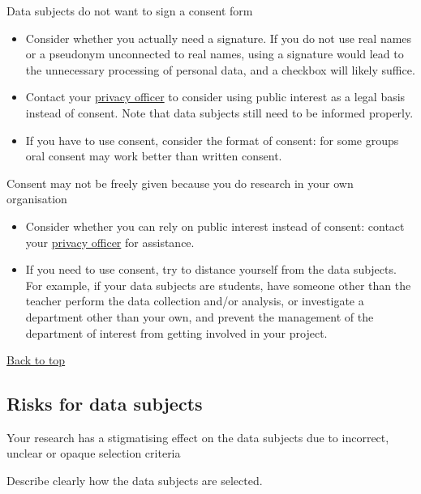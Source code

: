 \documentclass[
]{book}
\providecommand{\tightlist}{%
  \setlength{\itemsep}{0pt}\setlength{\parskip}{0pt}}
\begin{document}
Data subjects do not want to sign a consent form

\begin{itemize}
\tightlist
\item
  Consider whether you actually need a signature. If you do not use real names
  or a pseudonym unconnected to real names, using a signature would lead to the
  unnecessary processing of personal data, and a checkbox will likely suffice.
\item
  Contact your \protect\hyperlink{support}{privacy officer} to consider using public interest
  as a legal basis instead of consent. Note that data subjects still need to be
  informed properly.
\item
  If you have to use consent, consider the format of consent: for some groups
  oral consent may work better than written consent.\\
\end{itemize}

Consent may not be freely given because you do research in
your own organisation

\begin{itemize}
\tightlist
\item
  Consider whether you can rely on public interest instead of consent: contact
  your \protect\hyperlink{support}{privacy officer} for assistance.\\
\item
  If you need to use consent, try to distance yourself from the data subjects.
  For example, if your data subjects are students, have someone other than the
  teacher perform the data collection and/or analysis, or investigate a
  department other than your own, and prevent the management of the department
  of interest from getting involved in your project.\\
\end{itemize}

\protect\hyperlink{example-risks}{Back to top}

\hypertarget{risks-data-subjects}{%
\subsection{Risks for data subjects}\label{risks-data-subjects}}

Your research has a stigmatising effect on the data subjects
due to incorrect, unclear or opaque selection criteria

Describe clearly how the data subjects are selected.
\end{document}
